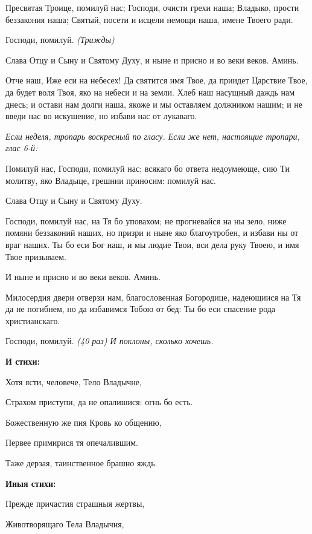 Пресвятая Троице, помилуй нас; Господи, очисти грехи наша; Владыко, прости беззакония наша; Святый, посети и исцели немощи наша, имене Твоего ради.


Господи, помилуй. \itshape (Трижды)\normalfont{}


Слава Отцу и Сыну и Святому Духу, и ныне и присно и во веки веков. Аминь.


Отче наш, Иже еси на небесех! Да святится имя Твое, да приидет Царствие Твое, да будет воля Твоя, яко на небеси и на земли. Хлеб наш насущный даждь нам днесь; и остави нам долги наша, якоже и мы оставляем должником нашим; и не введи нас во искушение, но избави нас от лукаваго.


\itshape Если неделя, тропарь воскресный по гласу. Если же нет, настоящие тропари, глас 6-й:\normalfont{}


Помилуй нас, Господи, помилуй нас; всякаго бо ответа недоумеюще, сию Ти молитву, яко Владыце, грешнии приносим: помилуй нас.


Слава Отцу и Сыну и Святому Духу.


Господи, помилуй нас, на Тя бо уповахом; не прогневайся на ны зело, ниже помяни беззаконий наших, но призри и ныне яко благоутробен, и избави ны от враг наших. Ты бо еси Бог наш, и мы людие Твои, вси дела руку Твоею, и имя Твое призываем.


И ныне и присно и во веки веков. Аминь.


Милосердия двери отверзи нам, благословенная Богородице, надеющиися на Тя да не погибнем, но да избавимся Тобою от бед: Ты бо еси спасение рода христианскаго.


Господи, помилуй. \itshape (40 раз) И поклоны, сколько хочешь.\normalfont{}




\bfseries И стихи:\normalfont{}



Хотя ясти, человече, Тело Владычне,


Страхом приступи, да не опалишися: огнь бо есть.


Божественную же пия Кровь ко общению,


Первее примирися тя опечалившим.


Таже дерзая, таинственное брашно яждь.



\bfseries Иныя стихи:\normalfont{}


Прежде причастия страшныя жертвы,

Животворящаго Тела Владычня,

